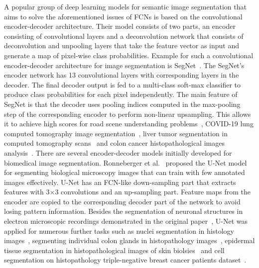 A popular group of deep learning models for semantic image segmentation that aims to solve the aforementioned issues of FCNs is based on the convolutional encoder-decoder architecture. Their model consists of two parts, an encoder consisting of convolutional layers and a deconvolution network that consists of deconvolution and unpooling layers that take the feature vector as input and generate a map of pixel-wise class probabilities. Example for such a convolutional encoder-decoder architecture for image segmentation is SegNet~\cite{badrinarayanan2017segnet}. The SegNet's encoder network has 13 convolutional layers with corresponding layers in the decoder. The final decoder output is fed to a multi-class soft-max classifier to produce class probabilities for each pixel independently. The main feature of SegNet is that the decoder uses pooling indices computed in the max-pooling step of the corresponding encoder to perform non-linear upsampling. This allows it to achieve high scores for road scene understanding problems~\cite{badrinarayanan2017segnet}, COVID-19 lung computed tomography image segmentation~\cite{saood2021covid}, liver tumor segmentation in computed tomography scans~\cite{almotairi2020liver} and colon cancer histopathological images analysis~\cite{hamida2021deep}. There are several encoder-decoder models initially developed for biomedical image segmentation. Ronneberger et al.~\cite{10.1007/978-3-319-24574-4_28} proposed the U-Net model for segmenting biological microscopy images that can train with few annotated images effectively. U-Net has an FCN-like down-sampling part that extracts features with 3$\times$3 convolutions and an up-sampling part. Feature maps from the encoder are copied to the corresponding decoder part of the network to avoid losing pattern information. Besides the segmentation of neuronal structures in electron microscopic recordings demonstrated in the original paper~\cite{10.1007/978-3-319-24574-4_28}, U-Net was applied for numerous further tasks such as nuclei segmentation in histology images~\cite{zeng2019ric}, segmenting individual colon glands in histopathology images~\cite{pinckaers2019neural}, epidermal tissue segmentation in histopathological images of skin biolsies~\cite{oskal2019u} and cell segmentation on histopathology triple-negative breast cancer patients dataset~\cite{bagdigen2020cell}.

